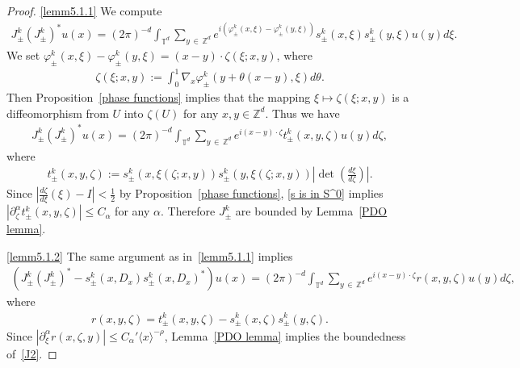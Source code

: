 \documentclass[10pt,a4paper]{amsart}
\renewcommand{\a}{\alpha}
\newcommand{\f}{\varphi}
\newcommand{\z}{\zeta}
\newcommand{\x}{\xi}
\newcommand{\Z}{\mathbb{Z}}
\newcommand{\T}{\mathbb{T}}
\newcommand{\la}{\langle}
\newcommand{\ra}{\rangle}
\begin{document}
\begin{proof}
\eqref{lemm5.1.1} We compute
\begin{align*}
J_\pm^k \left(J_\pm^k\right)^* u(x) = (2\pi)^{-d} \int_{\T^d} \sum_{y\,\in\,\Z^d} e^{i\left(\f_{\pm}^k(x,\x)-\f_{\pm}^k(y,\x)\right)} s_\pm^k(x,\x) s_\pm^k(y,\x) u(y) d\x.
\end{align*}
We set $\f_{\pm}^k(x,\x)-\f_{\pm}^k(y,\x) = (x-y) \cdot \z(\x;x,y)$, where
\begin{align*}
\z(\x;x,y) := \int_0^1 \nabla_x \f_{\pm}^k(y+\theta(x-y),\x) d\theta.
\end{align*}
Then Proposition~\ref{phase functions} implies that the mapping $\x \mapsto \z(\x;x,y)$ is a diffeomorphism from $U$ into $\z(U)$ for any $x,y \in \Z^d$. Thus we have
\begin{align*}
J_\pm^k \left(J_\pm^k\right)^* u(x) = (2\pi)^{-d} \int_{\T^d} \sum_{y\,\in\,\Z^d} e^{i(x-y)\cdot\z} t_\pm^k(x,y,\z) u(y) d\z,
\end{align*}
where
\begin{align*}
t_\pm^k(x,y,\z):=s_\pm^k(x,\x(\z;x,y)) s_\pm^k(y,\x(\z;x,y)) \left|\det\left(\frac{d\x}{d\z} \right)\right|.
\end{align*}
Since $|\frac{d\z}{d\x}(\x) - I| < \frac{1}{2}$ by Proposition~\ref{phase functions}, \eqref{s is in S^0} implies $|\partial_{\z}^\a t_\pm^k(x,y,\z)|\leq C_\a$ for any $\a$. Therefore $J_\pm^k$ are bounded by Lemma~\ref{PDO lemma}.


\eqref{lemm5.1.2} The same argument as in~\eqref{lemm5.1.1} implies
\begin{align*}
\left(J_\pm^k \left(J_\pm^k\right)^* - s_\pm^k(x,D_x) s_\pm^k(x,D_x)^* \right) u(x) 
= (2\pi)^{-d} \int_{\T^d} \sum_{y\,\in\,\Z^d} e^{i(x-y)\cdot\z} r(x,y,\z) u(y) d\z,
\end{align*}
where
\begin{align*}
r(x,y,\z)=t_\pm^k(x,y,\z) - s_\pm^k(x,\z) s_\pm^k(y,\z).
\end{align*}
Since $|\partial_\x^\a r(x,\z,y)| \leq C_\a' \la x \ra^{-\rho}$, Lemma~\ref{PDO lemma} implies the boundedness of~\eqref{J2}.


\end{proof}
\end{document}

